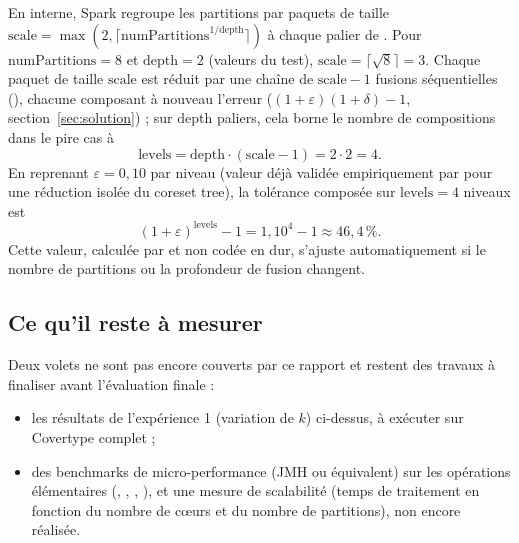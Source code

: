 En interne, Spark regroupe les partitions par paquets de taille
$\mathrm{scale} = \max(2, \lceil \mathrm{numPartitions}^{1/\mathrm{depth}}
\rceil)$ à chaque palier de . Pour $\mathrm{numPartitions} =
8$ et $\mathrm{depth} = 2$ (valeurs du test), $\mathrm{scale} =
\lceil\sqrt{8}\rceil = 3$. Chaque paquet de taille $\mathrm{scale}$ est
réduit par une chaîne de $\mathrm{scale}-1$ fusions séquentielles
(), chacune composant à nouveau l'erreur
($(1+\varepsilon)(1+\delta)-1$, section~\ref{sec:solution}) ; sur
$\mathrm{depth}$ paliers, cela borne le nombre de compositions dans le pire
cas à
\[
\mathrm{levels} = \mathrm{depth}\cdot(\mathrm{scale}-1) = 2\cdot 2 = 4.
\]
En reprenant $\varepsilon = 0{,}10$ par niveau (valeur déjà validée
empiriquement par  pour une réduction isolée du coreset
tree), la tolérance composée sur $\mathrm{levels}=4$ niveaux est
\[
(1+\varepsilon)^{\mathrm{levels}} - 1 = 1{,}10^4 - 1 \approx 46{,}4\,\%.
\]
Cette valeur, calculée par  et
non codée en dur, s'ajuste automatiquement si le nombre de partitions ou la
profondeur de fusion changent.

\subsection{Ce qu'il reste à mesurer}

Deux volets ne sont pas encore couverts par ce rapport et restent des
travaux à finaliser avant l'évaluation finale :
\begin{itemize}
  \item les résultats de l'expérience 1 (variation de $k$) ci-dessus,
        à exécuter sur Covertype complet ;
  \item des benchmarks de micro-performance (JMH ou équivalent) sur les
        opérations élémentaires (, ,
        , ), et une mesure
        de scalabilité (temps de traitement en fonction du nombre de cœurs
        et du nombre de partitions), non encore réalisée.
\end{itemize}
